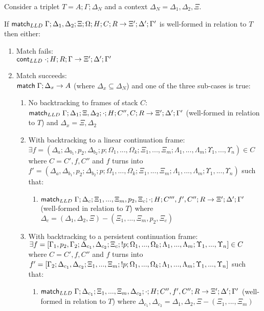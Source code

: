 \begin{lemma}\label{thm:body_match}
   
Consider a triplet $T = A; \Gamma; \Delta_{N}$ and a context $\Delta_{N} = \Delta_1, \Delta_2, \Xi$.

If $\mathsf{match}_{LLD} \; \Gamma; \Delta_1, \Delta_2; \Xi; \Omega; H; C; R \rightarrow \Xi'; \Delta'; \Gamma'$ is well-formed in relation to $T$ then either:

\begin{enumerate}
   \item Match fails: \\ $\mathsf{cont}_{LLD} \; \cdot; H; R; \Gamma \rightarrow \Xi'; \Delta'; \Gamma'$
   \item Match succeeds: \\
      $\mathsf{match} \; \Gamma; \Delta_x \rightarrow A$ (where $\Delta_x \subseteq \Delta_N$) and one of the three sub-cases is true:
      \begin{enumerate}
         \item No backtracking to frames of stack $C$: \\ $\mathsf{match}_{LLD} \; \Gamma; \Delta_1; \Xi, \Delta_2; \cdot; H; C'', C; R \rightarrow \Xi'; \Delta'; \Gamma'$ (well-formed in relation to $T$) and $\Delta_x = \Xi, \Delta_2$
         \item With backtracking to a linear continuation frame: \\ $\exists f = (\Delta_a; \Delta_{b_1}, p_2, \Delta_{b_2}; p; \Omega_1, ..., \Omega_k; \Xi_1, ..., \Xi_m; \Lambda_1, ..., \Lambda_m; \Upsilon_1, ..., \Upsilon_n) \in C$ where $C = C', f, C''$ and $f$ turns into $f' = (\Delta_a, \Delta_{b_1}, p_2; \Delta_{b_2}; p; \Omega_1, ..., \Omega_k; \Xi_1, ..., \Xi_m; \Lambda_1, ..., \Lambda_m; \Upsilon_1, ..., \Upsilon_n)$ such that:
         \begin{enumerate}
            \item $\mathsf{match}_{LLD} \; \Gamma; \Delta_c; \Xi_1, ..., \Xi_m, p_2, \Xi_c; \cdot; H; C''', f', C''; R \rightarrow \Xi'; \Delta'; \Gamma'$ (well-formed in relation to $T$) where $\Delta_c = (\Delta_1, \Delta_2, \Xi) - (\Xi_1, ..., \Xi_m, p_2, \Xi_c)$
         \end{enumerate}
         \item With backtracking to a persistent continuation frame: \\$\exists f = [\Gamma_1, p_2, \Gamma_2; \Delta_{c_1}, \Delta_{c_2}; \Xi_c; {!} p; \Omega_1, ..., \Omega_k; \Lambda_1, ..., \Lambda_m; \Upsilon_1, ..., \Upsilon_n] \in C$ where $C = C', f, C''$ and $f$ turns into $f' = [\Gamma_2; \Delta_{c_1}, \Delta_{c_2}; \Xi_1, ..., \Xi_m; {!} p; \Omega_1, ..., \Omega_k; \Lambda_1, ..., \Lambda_m; \Upsilon_1, ..., \Upsilon_n]$ such that:
         \begin{enumerate}
            \item $\mathsf{match}_{LLD} \; \Gamma; \Delta_{c_1}; \Xi_1, ..., \Xi_m, \Delta_{c_2}; \cdot; H; C'', f', C''; R \rightarrow \Xi'; \Delta'; \Gamma'$ (well-formed in relation to $T$) where $\Delta_{c_1}, \Delta_{c_2} = \Delta_1, \Delta_2, \Xi - (\Xi_1, ..., \Xi_m)$
         \end{enumerate}
      \end{enumerate}
\end{enumerate}


\end{lemma}
